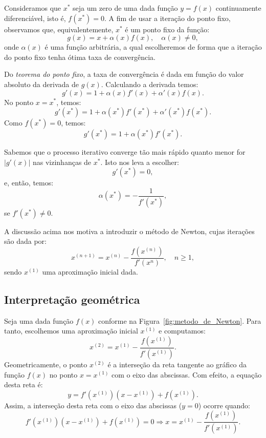 Consideramos que $x^*$ seja um zero de uma dada função $y = f(x)$ continuamente diferenciável, isto é, $f(x^*) = 0$. A fim de usar a iteração do ponto fixo, observamos que, equivalentemente, $x^*$ é um ponto fixo da função:
\begin{equation}
  g(x)= x + \alpha(x)f(x),\quad\alpha(x)\neq 0,
\end{equation}
onde $\alpha(x)$ é uma função arbitrária, a qual escolheremos de forma que a iteração do ponto fixo tenha ótima taxa de convergência.

Do \emph{teorema do ponto fixo}, a taxa de convergência é dada em função do valor absoluto da derivada de $g(x)$. Calculando a derivada temos:
\begin{equation}
  g'(x)=1+\alpha(x)f'(x)+\alpha'(x)f(x).
\end{equation}
No ponto $x = x^*$, temos:
\begin{equation}
  g'(x^*) = 1 + \alpha(x^*)f'(x^*) + \alpha'(x^*)f(x^*).
\end{equation}
Como $f(x^*)=0$, temos:
\begin{equation}
  g'(x^*) = 1 + \alpha(x^*)f'(x^*).
\end{equation}

Sabemos que o processo iterativo converge tão mais rápido quanto menor for $|g'(x)|$ nas vizinhanças de $x^*$. Isto nos leva a escolher:
\begin{equation}
  g'(x^*) = 0,
\end{equation}
e, então, temos:
\begin{equation}
  \alpha(x^*) = -\frac{1}{f'(x^*)},
\end{equation}
se $f'(x^*)\neq 0$.

A discussão acima nos motiva a introduzir o método de Newton, cujas iterações são dada por:
\begin{equation}
  x^{(n+1)} = x^{(n)} - \frac{f\left(x^{(n)}\right)}{f'\left(x^{n}\right)}, \quad n\geq 1,
\end{equation}
sendo $x^{(1)}$ uma aproximação inicial dada.

\subsection{Interpretação geométrica}

Seja uma dada função $f(x)$  conforme na Figura~\ref{fig:metodo_de_Newton}. Para tanto, escolhemos uma aproximação inicial $x^{(1)}$ e computamos:
\begin{equation}
  x^{(2)} = x^{(1)} - \frac{f(x^{(1)})}{f'(x^{(1)})}.
\end{equation}
Geometricamente, o ponto $x^{(2)}$ é a interseção da reta tangente ao gráfico da função $f(x)$ no ponto $x = x^{(1)}$ com o eixo das abscissas. Com efeito, a equação desta reta é:
\begin{equation}
  y = f'(x^{(1)})(x - x^{(1)}) + f(x^{(1)}).
\end{equation}
Assim, a interseção desta reta com o eixo das abscissas ($y=0$) ocorre quando:
\begin{equation}
  f'(x^{(1)})(x - x^{(1)}) + f(x^{(1)}) = 0\Rightarrow x = x^{(1)} - \frac{f(x^{(1)})}{f'(x^{(1)})}.
\end{equation}

